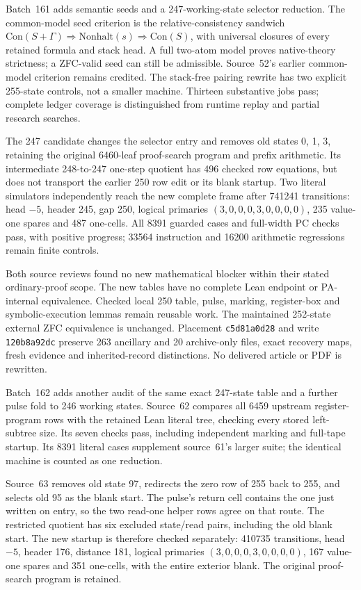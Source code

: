 \documentclass[11pt]{article}
\begin{document}
{Batch~161 adds semantic seeds and a 247-working-state selector reduction.
The common-model seed criterion is the relative-consistency sandwich
$\mathrm{Con}(S+\Gamma)\Rightarrow\mathrm{Nonhalt}(s)\Rightarrow\mathrm{Con}(S)$,
with universal closures of every retained formula and stack head. A full
two-atom model proves native-theory strictness; a ZFC-valid seed can still be
admissible. Source~52's earlier common-model criterion remains credited.
The stack-free pairing rewrite has two explicit 255-state controls, not a
smaller machine. Thirteen substantive jobs pass; complete ledger coverage
is distinguished from runtime replay and partial research searches.

The 247 candidate changes the selector entry and removes old states 0, 1, 3,
retaining the original 6460-leaf proof-search program and prefix arithmetic.
Its intermediate 248-to-247 one-step quotient has 496 checked row equations,
but does not transport the earlier 250 row edit or its blank startup.
Two literal simulators independently reach the new complete frame after
741241 transitions: head $-5$, header 245, gap 250, logical primaries
$(3,0,0,0,3,0,0,0,0)$, 235 value-one spares and 487 one-cells.
All 8391 guarded cases and full-width PC checks pass, with positive progress;
33564 instruction and 16200 arithmetic regressions remain finite controls.

Both source reviews found no new mathematical blocker within their stated
ordinary-proof scope. The new tables have no complete Lean endpoint or
PA-internal equivalence. Checked local 250 table, pulse, marking, register-box
and symbolic-execution lemmas remain reusable work. The maintained 252-state
external ZFC equivalence is unchanged. Placement \texttt{c5d81a0d28} and write
\texttt{120b8a92dc} preserve 263 ancillary and 20 archive-only files, exact
recovery maps, fresh evidence and inherited-record distinctions. No delivered
article or PDF is rewritten.

Batch~162 adds another audit of the same exact 247-state table and a further
pulse fold to 246 working states. Source~62 compares all 6459 upstream
register-program rows with the retained Lean literal tree, checking every
stored left-subtree size. Its seven checks pass, including independent
marking and full-tape startup. Its 8391 literal cases supplement source~61's
larger suite; the identical machine is counted as one reduction.

Source~63 removes old state 97, redirects the zero row of 255 back to 255,
and selects old 95 as the blank start. The pulse's return cell contains the
one just written on entry, so the two read-one helper rows agree on that
route. The restricted quotient has six excluded state/read pairs, including
the old blank start. The new startup is therefore checked separately:
410735 transitions, head $-5$, header 176, distance 181, logical primaries
$(3,0,0,0,3,0,0,0,0)$, 167 value-one spares and 351 one-cells, with the
entire exterior blank. The original proof-search program is retained.

}
\end{document}
